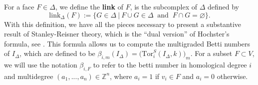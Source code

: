 \documentclass[12pt,leqno]{amsart}
\theoremstyle{definition}
\begin{document}
%
For a face $F \in \Delta$, we define the \textbf{link} of $F$, is the subcomplex of $\Delta$ defined by
%
\begin{displaymath}
  \mathrm{link}_\Delta(F) := \{ G \in \Delta \ | \ F \cup G \in \Delta \ \text{ and } \ F \cap G = \varnothing \}.
\end{displaymath}
%
With this definition, we have all the pieces necessary to present a substantive result of Stanley-Reisner theory, which is the ``dual version'' of Hochster's formula, see \cite[Corollary 1.40]{MS}. This formula allows us to compute the multigraded Betti numbers of $I_\Delta$, which are defined to be $\beta_{i,m}(I_\Delta) = \big( \mathrm{Tor}_i^S(I_\Delta, k) \big)_m$. For a subset $F \subset V$, we will use the notation $\beta_{i,F}$ to refer to the betti number in homological degree $i$ and multidegree $(a_1,...,a_n) \in \mathbb Z^n$, where $a_i = 1$ if $v_i \in F$ and $a_i = 0$ otherwise.
%
\end{document}
